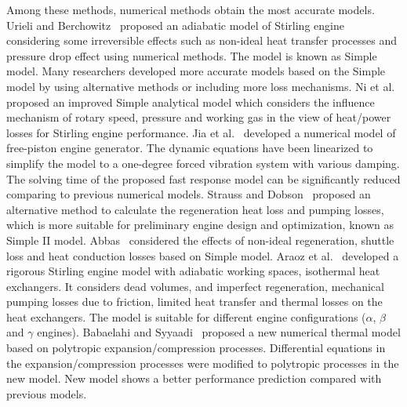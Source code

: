 \documentclass[review,3p,10t]{elsarticle}
\begin{document}
Among these methods, numerical methods obtain the most accurate models. Urieli and Berchowitz~\cite{Urieli1984} proposed an adiabatic model of Stirling engine considering some irreversible effects such as non-ideal heat transfer processes and pressure drop effect using numerical methods. The model is known as Simple model. Many researchers developed more accurate models based on the Simple model by using alternative methods or including more loss mechanisms. 
Ni et al.~\cite{Ni2016} proposed an improved Simple analytical model which considers the influence mechanism of rotary speed, pressure and working gas in the view of heat/power losses for Stirling engine performance.
Jia et al.~\cite{Jia2016} developed a numerical model of free-piston engine generator. The dynamic equations have been linearized to simplify the model to a one-degree forced vibration system with various damping. The solving time of the proposed fast response model can be significantly reduced comparing to previous numerical models.
Strauss and Dobson~\cite{Strauss2010} proposed an alternative method to calculate the regeneration heat loss and pumping losses, which is more suitable for preliminary engine design and optimization, known as Simple II model.
Abbas~\cite{Abbas2014} considered the effects of non-ideal regeneration, shuttle loss and heat conduction losses based on Simple model. 
Araoz et al.~\cite{Araoz2015} developed a rigorous Stirling engine model with adiabatic working spaces, isothermal heat exchangers. It considers dead volumes, and imperfect regeneration, mechanical pumping losses due to friction, limited heat transfer and thermal losses on the heat exchangers. The model is suitable for different engine configurations ($\alpha$, $\beta$ and $\gamma$ engines).
Babaelahi and Syyaadi~\cite{Babaelahi2015} proposed a new numerical thermal model based on polytropic expansion/compression processes. Differential equations in the expansion/compression processes were modified to polytropic processes in the new model. New model shows a better performance prediction compared with previous models.
\end{document}
